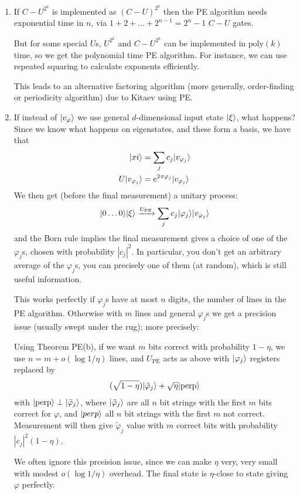 \documentclass[]{article}
\renewcommand{\phi}{\varphi}
\newcommand{\poly}{\textrm{poly}}
\begin{document}
\begin{remark*}\ 
	\begin{enumerate}
		\item If $C-U^{2^k}$ is implemented as $(C-U)^{2^k}$ then the PE algorithm needs exponential time in $n$, via $1 + 2 +\dots + 2^{n-1} = 2^{n}-1$ $C-U$ gates.
		
		But for some special $U$s, $U^{2^k}$ and $C-U^{2^k}$ can be implemented in $\poly(k)$ time, so we get the polynomial time PE algorithm. For instance, we can use repeated squaring to calculate exponents efficiently.

		This leads to an alternative factoring algorithm (more generally, order-finding or periodicity algorithm) due to Kitaev using PE.

		\item If instead of $\ket{v_\phi}$ we use general $d$-dimensional input state $\lvert\xi\rangle$, what happens? Since we know what happens on eigenstates, and these form a basis, we have that
		\begin{align*}
			\ket{xi} &= \sum_{j}c_j\ket{v_{\phi_j}}\\
			U\ket{v_{\phi_j}} &= \e^{2\pi \phi_j}\ket{v_{\phi_j}}
		\end{align*}
		We then get (before the final measurement) a unitary process:
		\begin{align*}
			\ket{0\dots 0}\ket{\xi} \xrightarrow{U_{\textrm{PE}}} \sum_{j}c_j\ket{\phi_j}\ket{v_{\phi_j}}
		\end{align*}
		and the Born rule implies the final measurement gives a choice of one of the $\phi_j$s, chosen with probability $|c_j|^2$. In particular, you don't get an arbitrary average of the $\phi_j$s, you can precisely one of them (at random), which is still useful information.

		This works perfectly if $\phi_j$s have at most $n$ digits, the number of lines in the PE algorithm. Otherwise with $m$ lines and general $\phi_j$s we get a precision issue (usually swept under the rug); more precisely:

		Using Theorem PE(b), if we want $m$ bits correct with probability $1 - \eta$, we use $n = m + o(\log 1/\eta)$ lines, and $U_{\textrm{PE}}$ acts as above with $\ket{\phi_j}$ registers replaced by
		\begin{align*}
			(\sqrt{1-\eta})\ket{\tilde{\phi}_j}+\sqrt{\eta}\ket{\textrm{perp}}
		\end{align*}
		with $\ket{\textrm{perp}}\perp \ket{\tilde{\phi}_j}$, where $\ket{\tilde{\phi}_j}$ are all $n$ bit strings with the first $m$ bits correct for $\phi$, and $\lvert perp\rangle$ all $n$ bit strings with the first $m$ not correct. Measurement will then give $\tilde{\phi}_j$ value with $m$ correct bits with probability $|c_j|^2(1-\eta)$.

		We often ignore this prceision issue, since we can make $\eta$ very, very small with modest $o(\log 1/\eta)$ overhead. The final state is $\eta$-close to state giving $\phi$ perfectly.
	\end{enumerate}

\end{remark*}
\end{document}
